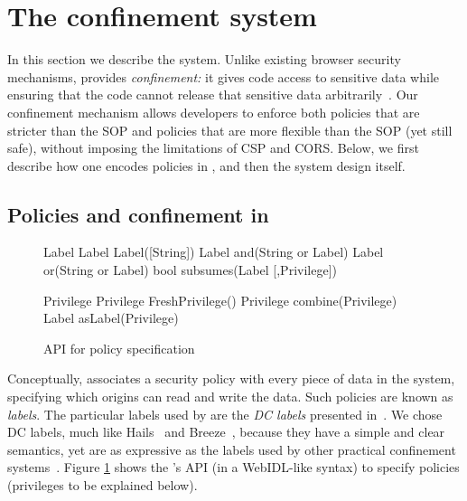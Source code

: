 

\section{The \sys{} confinement system}
\label{sec:system}

In this section we describe the \sys{} system.
%
Unlike existing browser security mechanisms, \sys{} provides
\emph{confinement:} it gives code access to sensitive
data while ensuring that the code cannot release that sensitive
data arbitrarily~\cite{SaltzerS75}.
%
Our confinement mechanism allows developers to enforce both policies
that are stricter than the SOP and policies that are more flexible
than the SOP (yet still safe), without imposing the limitations of CSP
and CORS.
%
Below, we first describe how one encodes policies in \sys{}, and then
the system design itself.

\subsection{Policies and confinement in \sys{}}
\label{sec:system:policy}

\begin{figure}
{\small{
\begin{webidl}
Label {
  Label Label([String])
  Label and(String or Label)
  Label or(String or Label)
  bool subsumes(Label [,Privilege])
}
\end{webidl}
\begin{webidl}
Privilege {
  Privilege FreshPrivilege()
  Privilege combine(Privilege)
  Label asLabel(Privilege)
}
\end{webidl}
}}
\vspace{-10pt}
\caption{\label{fig:APIspec} API for policy specification}
\vspace{-10pt}
\end{figure}


Conceptually, \sys{} associates a security policy with every piece of
data in the system, specifying which origins can read and write the
data.
%
Such policies are known as \emph{labels}.
%
The particular labels used by \sys{} are the \emph{DC
labels} presented in~\cite{stefan:2011:dclabels}.
%
We chose DC labels, much like Hails~\cite{giffin:2012:hails} and
Breeze~\cite{Breeze13}, because they have a simple and clear semantics, yet are
as expressive as the labels used by other practical confinement
systems~\cite{GenLabels}. Figure \ref{fig:APIspec} shows the \sys{}'s API (in a
WebIDL-like syntax) to specify policies (privileges to be
explained below).


